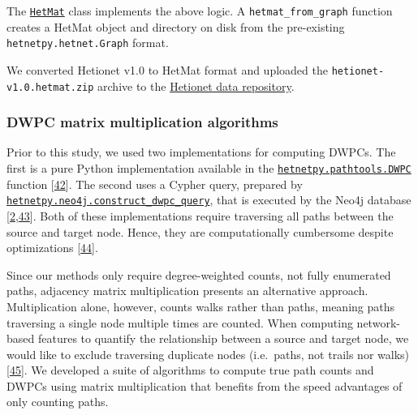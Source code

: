 The \href{https://hetio.github.io/hetmatpy/reference/hetmatpy/hetmat/\#hetmat}{\texttt{HetMat}} class implements the above logic.
A \texttt{hetmat\_from\_graph} function creates a HetMat object and directory on disk from the pre-existing \texttt{hetnetpy.hetnet.Graph} format.

We converted Hetionet v1.0 to HetMat format and uploaded the \texttt{hetionet-v1.0.hetmat.zip} archive to the \href{https://github.com/hetio/hetionet/tree/master/hetnet/matrix}{Hetionet data repository}.

\hypertarget{dwpc-matrix-multiplication-algorithms}{%
\subsubsection{DWPC matrix multiplication algorithms}\label{dwpc-matrix-multiplication-algorithms}}

Prior to this study, we used two implementations for computing DWPCs.
The first is a pure Python implementation available in the \href{https://github.com/hetio/hetnetpy/blob/aa16e6a7092c039a6b175a73a35c006e53acee20/hetnetpy/pathtools.py\#L8-L21}{\texttt{hetnetpy.pathtools.DWPC}} function {[}\protect\hyperlink{ref-WkPlH1ds}{42}{]}.
The second uses a Cypher query, prepared by \href{https://github.com/hetio/hetnetpy/blob/aa16e6a7092c039a6b175a73a35c006e53acee20/hetnetpy/neo4j.py\#L363-L393}{\texttt{hetnetpy.neo4j.construct\_dwpc\_query}}, that is executed by the Neo4j database {[}\protect\hyperlink{ref-O21tn8vf}{2},\protect\hyperlink{ref-kNYoxBiQ}{43}{]}.
Both of these implementations require traversing all paths between the source and target node.
Hence, they are computationally cumbersome despite optimizations {[}\protect\hyperlink{ref-xWWaK51z}{44}{]}.

Since our methods only require degree-weighted counts, not fully enumerated paths, adjacency matrix multiplication presents an alternative approach.
Multiplication alone, however, counts walks rather than paths, meaning paths traversing a single node multiple times are counted.
When computing network-based features to quantify the relationship between a source and target node,
we would like to exclude traversing duplicate nodes (i.e.~paths, not trails nor walks) {[}\protect\hyperlink{ref-w6rL3OYz}{45}{]}.
We developed a suite of algorithms to compute true path counts and DWPCs using matrix multiplication that benefits from the speed advantages of only counting paths.

